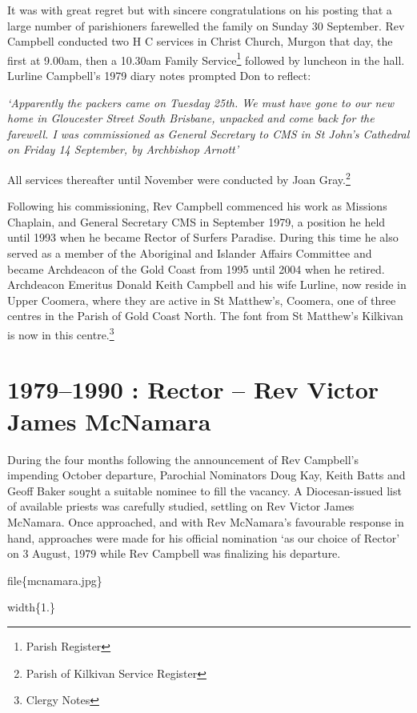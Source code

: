 It was with great regret but with sincere congratulations on his posting that a large number of parishioners farewelled the family on Sunday 30 September. Rev Campbell conducted two H C services in Christ Church, Murgon that day, the first at 9.00am, then a 10.30am Family Service\footnote{Parish Register} followed by luncheon in the hall. Lurline Campbell's 1979 diary notes prompted Don to reflect:

\emph{`Apparently the packers came on Tuesday 25th. We must have gone to our new home in Gloucester Street South Brisbane, unpacked and come back for the farewell. I was commissioned as General Secretary to CMS in St John's Cathedral on Friday 14 September, by Archbishop Arnott'}

All services thereafter until November were conducted by Joan Gray.\footnote{Parish of Kilkivan Service Register}

Following his commissioning, Rev Campbell commenced his work as Missions Chaplain, and General Secretary CMS in September 1979, a position he held until 1993 when he became Rector of Surfers Paradise. During this time he also served as a member of the Aboriginal and Islander Affairs Committee and became Archdeacon of the Gold Coast from 1995 until 2004 when he retired. Archdeacon Emeritus Donald Keith Campbell and his wife Lurline, now reside in Upper Coomera, where they are active in St Matthew's, Coomera, one of three centres in the Parish of Gold Coast North. The font from St Matthew's Kilkivan is now in this centre.\footnote{Clergy Notes}

\hypertarget{rector-rev-victor-james-mcnamara}{%
\chapter{1979--1990 : Rector -- Rev Victor James McNamara}\label{rector-rev-victor-james-mcnamara}}

During the four months following the announcement of Rev Campbell's impending October departure, Parochial Nominators Doug Kay, Keith Batts and Geoff Baker sought a suitable nominee to fill the vacancy. A Diocesan-issued list of available priests was carefully studied, settling on Rev Victor James McNamara. Once approached, and with Rev McNamara's favourable response in hand, approaches were made for his official nomination `as our choice of Rector' on 3 August, 1979 while Rev Campbell was finalizing his departure.

file\{mcnamara.jpg\}

width\{1.\}

